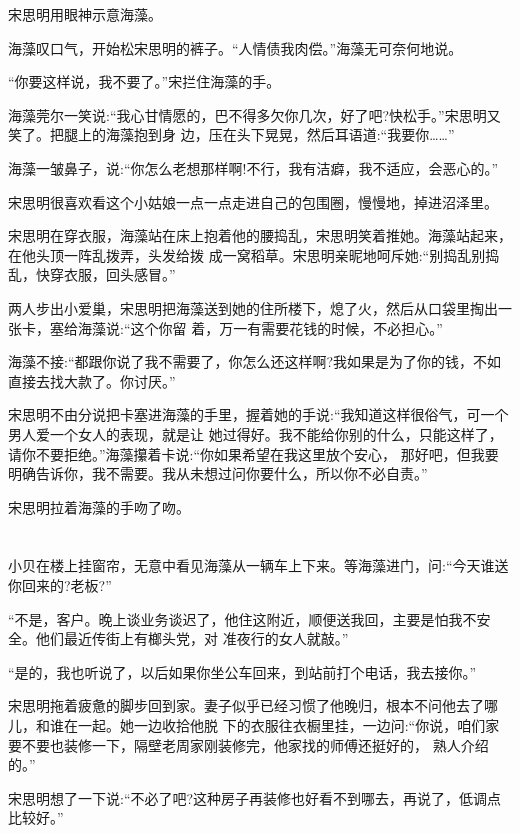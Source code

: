 \documentclass[11pt,a4paper,onecolumn]{article}
\begin{document}
宋思明用眼神示意海藻。

海藻叹口气，开始松宋思明的裤子。``人情债我肉偿。''海藻无可奈何地说。

``你要这样说，我不要了。''宋拦住海藻的手。

海藻莞尔一笑说:``我心甘情愿的，巴不得多欠你几次，好了吧?快松手。''宋思明又笑了。把腿上的海藻抱到身
边，压在头下晃晃，然后耳语道:``我要你……''

海藻一皱鼻子，说:``你怎么老想那样啊!不行，我有洁癖，我不适应，会恶心的。''

宋思明很喜欢看这个小姑娘一点一点走进自己的包围圈，慢慢地，掉进沼泽里。

宋思明在穿衣服，海藻站在床上抱着他的腰捣乱，宋思明笑着推她。海藻站起来，在他头顶一阵乱拨弄，头发给拨
成一窝稻草。宋思明亲昵地呵斥她:``别捣乱别捣乱，快穿衣服，回头感冒。''

两人步出小爱巢，宋思明把海藻送到她的住所楼下，熄了火，然后从口袋里掏出一张卡，塞给海藻说:``这个你留
着，万一有需要花钱的时候，不必担心。''

海藻不接:``都跟你说了我不需要了，你怎么还这样啊?我如果是为了你的钱，不如直接去找大款了。你讨厌。''

宋思明不由分说把卡塞进海藻的手里，握着她的手说:``我知道这样很俗气，可一个男人爱一个女人的表现，就是让
她过得好。我不能给你别的什么，只能这样了，请你不要拒绝。''海藻攥着卡说:``你如果希望在我这里放个安心，
那好吧，但我要明确告诉你，我不需要。我从未想过问你要什么，所以你不必自责。''

宋思明拉着海藻的手吻了吻。

\section[\thesection]{}

小贝在楼上挂窗帘，无意中看见海藻从一辆车上下来。等海藻进门，问:``今天谁送你回来的?老板?''

``不是，客户。晚上谈业务谈迟了，他住这附近，顺便送我回，主要是怕我不安全。他们最近传街上有榔头党，对
准夜行的女人就敲。''

``是的，我也听说了，以后如果你坐公车回来，到站前打个电话，我去接你。''

宋思明拖着疲惫的脚步回到家。妻子似乎已经习惯了他晚归，根本不问他去了哪儿，和谁在一起。她一边收拾他脱
下的衣服往衣橱里挂，一边问:``你说，咱们家要不要也装修一下，隔壁老周家刚装修完，他家找的师傅还挺好的，
熟人介绍的。''

宋思明想了一下说:``不必了吧?这种房子再装修也好看不到哪去，再说了，低调点比较好。''
\end{document}

